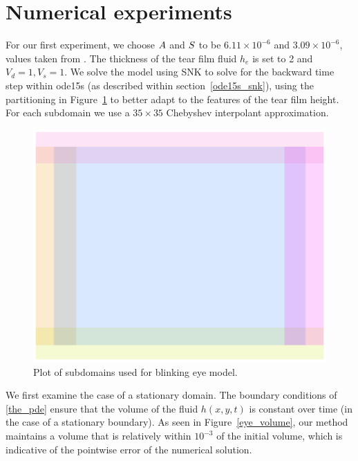\section{Numerical experiments}
\label{eye_experiments}
For our first experiment, we choose $A$ and $S$ to be $6.11 \times 10^{-6}$ and $3.09 \times 10^{-6}$, values taken from \cite{braun2015dynamics}. The thickness of the tear film fluid $h_e$ is set to 2 and $V_d=1, V_s=1$.  We solve the model using SNK to solve for the backward time step within ode15s (as described within section~\ref{ode15s_snk}), using the partitioning in Figure~\ref{eye_partition} to better adapt to the features of the tear film height. For each subdomain we use a $35 \times 35$ Chebyshev interpolant approximation.
\begin{figure}
	\centering
	\includegraphics[scale=0.6]{Chapter4/Eye_domains}
	\caption{Plot of subdomains used for blinking eye model.}
	\label{eye_partition}
\end{figure}

We first examine the case of a stationary domain. The boundary conditions of \ref{the_pde} ensure that the volume of the fluid $h(x,y,t)$ is constant over time (in the case of a stationary boundary). As seen in Figure~\ref{eye_volume}, our method maintains a volume that is relatively within $10^{-3}$ of the initial volume, which is indicative of the pointwise error of the numerical solution.

